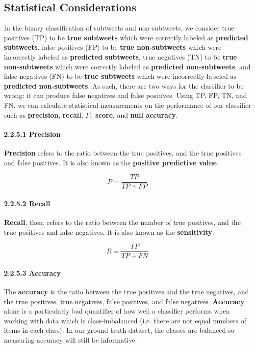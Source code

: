 \documentclass[11pt, twoside, reqno]{book}
\begin{document}
\subsection{Statistical Considerations}
\label{statistical_considerations}

In the binary classification of subtweets and non-subtweets, we consider true positives (TP) to be \textbf{true subtweets} which were correctly labeled as \textbf{predicted subtweets}, false positives (FP) to be \textbf{true non-subtweets} which were incorrectly labeled as \textbf{predicted subtweets}, true negatives (TN) to be \textbf{true non-subtweets} which were correctly labeled as \textbf{predicted non-subtweets}, and false negatives (FN) to be \textbf{true subtweets} which were incorrectly labeled as \textbf{predicted non-subtweets}. As such, there are two ways for the classifier to be wrong: it can produce false negatives and false positives. Using TP, FP, TN, and FN, we can calculate statistical measurements on the performance of our classifier such as \textbf{precision}, \textbf{recall}, \textbf{$F_{1}$ score}, and \textbf{null accuracy}.

\paragraph{2.2.5.1  Precision}
\label{precision}

\textbf{Precision} refers to the ratio between the true positives, and the true positives and false positives. It is also known as the \textbf{positive predictive value}.

\[P=\frac{TP}{TP+FP}\] 

\paragraph{2.2.5.2  Recall}
\label{recall}

\textbf{Recall}, then, refers to the ratio between the number of true positives, and the true positives and false negatives. It is also known as the \textbf{sensitivity}.

\[R=\frac{TP}{TP+FN}\] 

\paragraph{2.2.5.3  Accuracy}
\label{accuracy}

The \textbf{accuracy} is the ratio between the true positives and the true negatives, and the true positives, true negatives, false positives, and false negatives. \textbf{Accuracy} alone is a particularly bad quantifier of how well a classifier performs when working with data which is class-imbalanced (i.e. there are not equal numbers of items in each class). In our ground truth dataset, the classes are balanced so measuring accuracy will still be informative.
\end{document}
